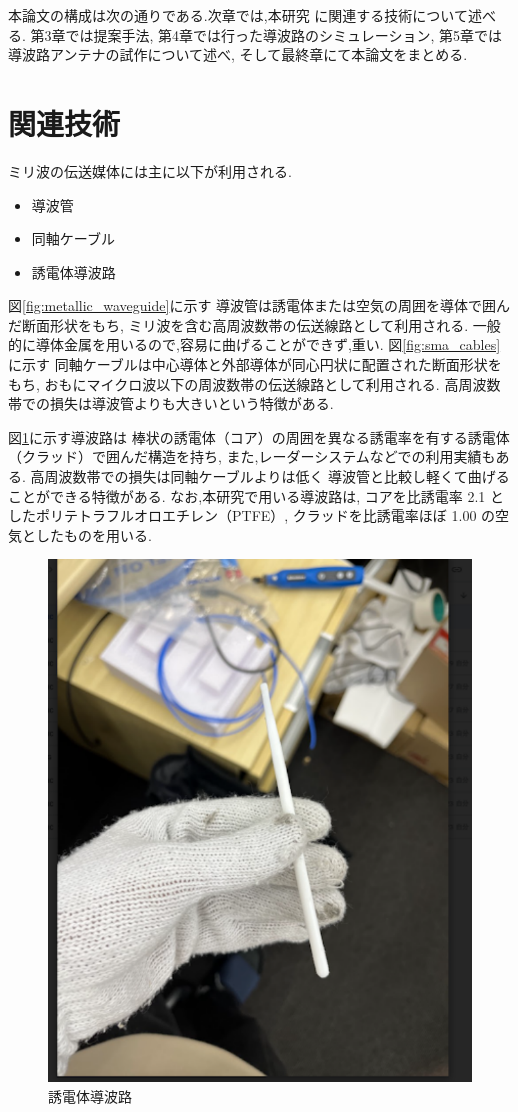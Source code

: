 \documentclass[technicalreport]{ieicej}
\begin{document}
本論文の構成は次の通りである.次章では,本研究
に関連する技術について述べる.
第3章では提案手法,
第4章では行った導波路のシミュレーション,
第5章では導波路アンテナの試作について述べ,
そして最終章にて本論文をまとめる.

\section{関連技術}

ミリ波の伝送媒体には主に以下が利用される.
\begin{itemize}
  \item 導波管
  \item 同軸ケーブル
  \item 誘電体導波路
\end{itemize}

図\ref{fig:metallic_waveguide}に示す
導波管は誘電体または空気の周囲を導体で囲んだ断面形状をもち,
ミリ波を含む高周波数帯の伝送線路として利用される.
一般的に導体金属を用いるので,容易に曲げることができず,重い.
図\ref{fig:sma_cables}に示す
同軸ケーブルは中心導体と外部導体が同心円状に配置された断面形状をもち,
おもにマイクロ波以下の周波数帯の伝送線路として利用される.
高周波数帯での損失は導波管よりも大きいという特徴がある.

図\ref{fig:dielectric_waveguide}に示す導波路は
棒状の誘電体（コア）の周囲を異なる誘電率を有する誘電体（クラッド）で囲んだ構造を持ち,
また,レーダーシステム\cite{4297420}などでの利用実績もある.
高周波数帯での損失は同軸ケーブルよりは低く
導波管と比較し軽くて曲げることができる特徴がある.
なお,本研究で用いる導波路は,
コアを比誘電率 2.1 としたポリテトラフルオロエチレン（PTFE）,
クラッドを比誘電率ほぼ 1.00 の空気としたものを用いる.

\begin{figure}[tb]
  \begin{center}
    \includegraphics[bb=0 0 311 384, width=0.5\linewidth]{img/waveguide.pdf}
    \caption{誘電体導波路}
    \label{fig:dielectric_waveguide}
  \end{center}
\end{figure}
\end{document}
